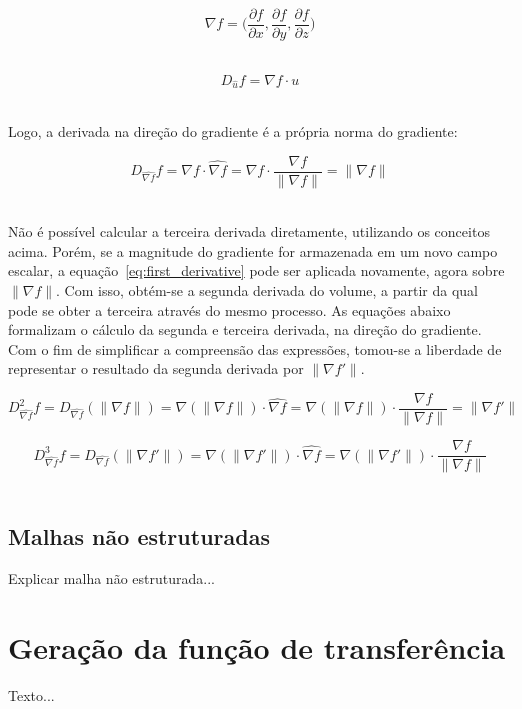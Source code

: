 \begin{equation}\label{eq:grad}
	\nabla f = \bigg(\frac{\partial f}{\partial x}, \frac{\partial f}{\partial y}, \frac{\partial f}{\partial z}\bigg)
\end{equation} \

\begin{equation}\label{eq:ddir}
D_{\widehat{u}} f = \nabla f \cdot u
\end{equation} \

	Logo, a derivada na direção do gradiente é a própria norma do gradiente:

\begin{equation}\label{eq:first_derivative}
	D_{\widehat{\nabla f}} f = \nabla f \cdot \widehat{\nabla f} = \nabla f \cdot \frac{\nabla f}{\|\nabla f\|} = \|\nabla f\|
\end{equation} \

	Não é possível calcular a terceira derivada diretamente, utilizando os conceitos acima. Porém, se a magnitude do gradiente for armazenada em um novo campo escalar, a equação~\eqref{eq:first_derivative} pode ser aplicada novamente, agora sobre $ \|\nabla f\| $. Com isso, obtém-se a segunda derivada do volume, a partir da qual pode se obter a terceira através do mesmo processo. As equações abaixo formalizam o cálculo da segunda e terceira derivada, na direção do gradiente. Com o fim de simplificar a compreensão das expressões, tomou-se a liberdade de representar o resultado da segunda derivada por $ \|\nabla f'\| $.
	
\begin{equation}\label{eq:second_derivative}
	D^{2}_{\widehat{\nabla f}} f = D_{\widehat{\nabla f}} (\|\nabla f\|) = \nabla (\|\nabla f\|) \cdot \widehat{\nabla f} = \nabla (\|\nabla f\|) \cdot \frac{\nabla f}{\|\nabla f\|} = \|\nabla f'\|
\end{equation}

\begin{equation}\label{eq:third_derivative}
	D^{3}_{\widehat{\nabla f}} f = D_{\widehat{\nabla f}} (\|\nabla f'\|) = \nabla (\|\nabla f'\|) \cdot \widehat{\nabla f} = \nabla (\|\nabla f'\|) \cdot \frac{\nabla f}{\|\nabla f\|}
\end{equation} \

\subsection{Malhas não estruturadas}
\label{subsec:my.nonstruct}
	Explicar malha não estruturada...

\section{Geração da função de transferência}
\label{sec:my.tf}
	Texto...
